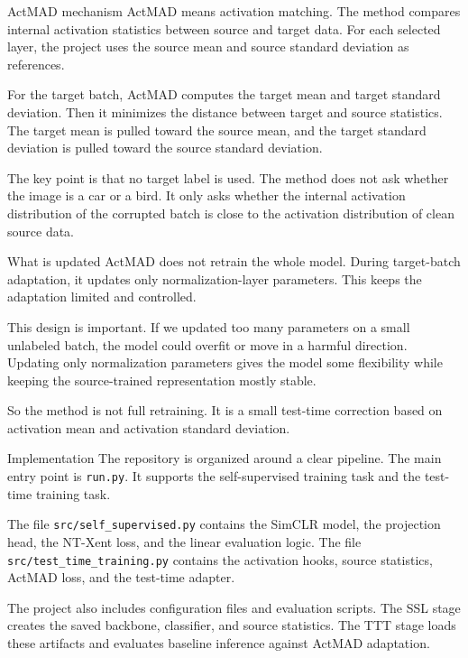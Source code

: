 \documentclass[11pt,a4paper]{article}
\begin{document}
\begin{rayanebox}{ActMAD mechanism}
ActMAD means activation matching. The method compares internal activation statistics between source and target data. For each selected layer, the project uses the source mean and source standard deviation as references.

For the target batch, ActMAD computes the target mean and target standard deviation. Then it minimizes the distance between target and source statistics. The target mean is pulled toward the source mean, and the target standard deviation is pulled toward the source standard deviation.

The key point is that no target label is used. The method does not ask whether the image is a car or a bird. It only asks whether the internal activation distribution of the corrupted batch is close to the activation distribution of clean source data.
\end{rayanebox}

\begin{rayanebox}{What is updated}
ActMAD does not retrain the whole model. During target-batch adaptation, it updates only normalization-layer parameters. This keeps the adaptation limited and controlled.

This design is important. If we updated too many parameters on a small unlabeled batch, the model could overfit or move in a harmful direction. Updating only normalization parameters gives the model some flexibility while keeping the source-trained representation mostly stable.

So the method is not full retraining. It is a small test-time correction based on activation mean and activation standard deviation.
\end{rayanebox}

\begin{rayanebox}{Implementation}
The repository is organized around a clear pipeline. The main entry point is \texttt{run.py}. It supports the self-supervised training task and the test-time training task.

The file \texttt{src/self\_supervised.py} contains the SimCLR model, the projection head, the NT-Xent loss, and the linear evaluation logic. The file \texttt{src/test\_time\_training.py} contains the activation hooks, source statistics, ActMAD loss, and the test-time adapter.

The project also includes configuration files and evaluation scripts. The SSL stage creates the saved backbone, classifier, and source statistics. The TTT stage loads these artifacts and evaluates baseline inference against ActMAD adaptation.
\end{rayanebox}
\end{document}

